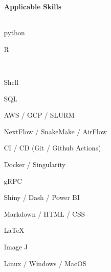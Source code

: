 \vspace{0.4cm}
{\Large \textbf{Applicable Skills}}\\[-0.4cm]
\makebox[\linewidth]{\rule{1.0\textwidth}{0.4pt}}\\
\vspace{-0.2cm}
\begin{addmargin}[-0.65cm]{0cm} 
\begin{itemize}[itemsep=0cm]
  \begin{minipage}[t]{0.2\linewidth}   
    \item[] {\FluxR python}
    \item[] \textsf{R}
    \item[] \CC\
    \item[] Shell
    \item[] SQL
  \end{minipage}
  \begin{minipage}[t]{0.35\linewidth}
    \item[] AWS / GCP / SLURM
    \item[] NextFlow / SnakeMake / AirFlow
    \item[] CI / CD (Git / Github Actions)
    \item[] Docker / Singularity
    \item[] gRPC
  \end{minipage}
  \begin{minipage}[t]{0.35\linewidth}
    \item[] Shiny / Dash / Power BI
    \item[] Markdown / HTML / CSS
    \item[] \LaTeX
    \item[] Image J
    \item[] Linux / Windows / MacOS
  \end{minipage}
  
\end{itemize}
\end{addmargin}

